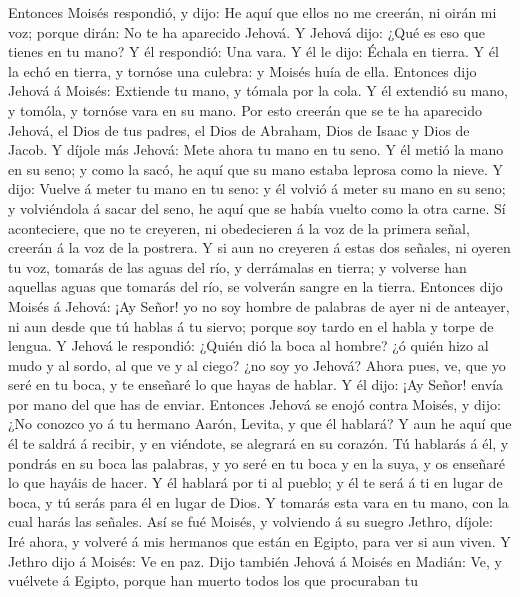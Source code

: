  Entonces Moisés respondió, y dijo: He aquí que ellos no me
creerán, ni oirán mi voz; porque dirán: No te ha aparecido Jehová.
 Y Jehová dijo: ¿Qué es eso que tienes en tu mano? Y él
respondió: Una vara.  Y él le dijo: Échala en tierra. Y él
la echó en tierra, y tornóse una culebra: y Moisés huía de ella.
 Entonces dijo Jehová á Moisés: Extiende tu mano, y tómala
por la cola. Y él extendió su mano, y tomóla, y tornóse vara en su mano.
 Por esto creerán que se te ha aparecido Jehová, el Dios de
tus padres, el Dios de Abraham, Dios de Isaac y Dios de Jacob.
 Y díjole más Jehová: Mete ahora tu mano en tu seno. Y él
metió la mano en su seno; y como la sacó, he aquí que su mano estaba
leprosa como la nieve.  Y dijo: Vuelve á meter tu mano en tu
seno: y él volvió á meter su mano en su seno; y volviéndola á sacar del
seno, he aquí que se había vuelto como la otra carne.  Sí
aconteciere, que no te creyeren, ni obedecieren á la voz de la primera
señal, creerán á la voz de la postrera.  Y si aun no
creyeren á estas dos señales, ni oyeren tu voz, tomarás de las aguas del
río, y derrámalas en tierra; y volverse han aquellas aguas que tomarás
del río, se volverán sangre en la tierra.  Entonces dijo
Moisés á Jehová: ¡Ay Señor! yo no soy hombre de palabras de ayer ni de
anteayer, ni aun desde que tú hablas á tu siervo; porque soy tardo en el
habla y torpe de lengua.  Y Jehová le respondió: ¿Quién dió
la boca al hombre? ¿ó quién hizo al mudo y al sordo, al que ve y al
ciego? ¿no soy yo Jehová?  Ahora pues, ve, que yo seré en
tu boca, y te enseñaré lo que hayas de hablar.  Y él dijo:
¡Ay Señor! envía por mano del que has de enviar.  Entonces
Jehová se enojó contra Moisés, y dijo: ¿No conozco yo á tu hermano
Aarón, Levita, y que él hablará? Y aun he aquí que él te saldrá á
recibir, y en viéndote, se alegrará en su corazón.  Tú
hablarás á él, y pondrás en su boca las palabras, y yo seré en tu boca y
en la suya, y os enseñaré lo que hayáis de hacer.  Y él
hablará por ti al pueblo; y él te será á ti en lugar de boca, y tú serás
para él en lugar de Dios.  Y tomarás esta vara en tu mano,
con la cual harás las señales.  Así se fué Moisés, y
volviendo á su suegro Jethro, díjole: Iré ahora, y volveré á mis
hermanos que están en Egipto, para ver si aun viven. Y Jethro dijo á
Moisés: Ve en paz.  Dijo también Jehová á Moisés en Madián:
Ve, y vuélvete á Egipto, porque han muerto todos los que procuraban tu
